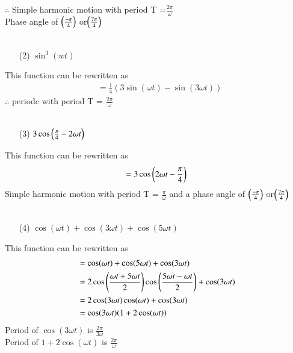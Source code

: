 \documentclass[journal,12pt,twocolumn]{IEEEtran}
\theoremstyle{remark}
\begin{document}
 $\therefore$ Simple harmonic motion with period {T} =$\frac{2\pi}{\omega}$\\ Phase angle of $\left(\frac{-\pi}{4}\right)$ or$\left(\frac{7\pi}{4}\right)$\\
\\
\begin{enumerate}
    \item[(2)] $\sin^3(wt)$\\
\end{enumerate}
 This function can be rewritten as\\ 
 \begin{align}
  &=\frac{1}{4}(3\sin(\omega t)-\sin(3 \omega t))
 \end{align}
 $\therefore$ periodc with period {T} = $\frac{2\pi}{\omega}$ \\
\\
\begin{enumerate}
    \item[(3)] $3\cos\left(\frac{\pi}{4}-2\omega t\right)$\\
\end{enumerate}
This function can be rewritten as\\ 
 \begin{align}
  =3\cos\left(2\omega t-\frac{\pi}{4}\right)\\
 \end{align}
 Simple harmonic motion with period {T} = $\frac{\pi}{\omega}$  and a phase angle of  $\left(\frac{-\pi}{4}\right)$ or$\left(\frac{7\pi}{4}\right)$\\
 \\
 \begin{enumerate}
 \item[(4)]  $\cos(\omega t)+\cos(3\omega t)+\cos(5\omega t)$\\
\end{enumerate}
This function can be rewritten as\\ 
 \begin{align}
  &=\cos(\omega t)+\cos(5\omega t)+\cos(3\omega t)\\
  &=2\cos\left(\frac{\omega t+5\omega t}{2}\right)\cos\left(\frac{5\omega t-\omega t}{2}\right) +\cos(3\omega t)\\
  &=2\cos(3\omega t) \cos(\omega t)+\cos(3\omega t)\\
  &=\cos(3\omega t) (1+2\cos(\omega t))
 \end{align}
 Period of $\cos(3\omega t)$ is $\frac{2\pi}{3\omega}$\\ 
 Period of $1+2\cos(\omega t)$ is $\frac{2\pi}{\omega}$\\ 
\end{document}
